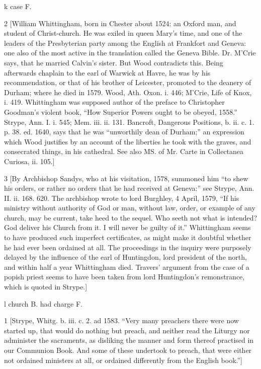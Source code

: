k
case F.

2
[William Whittingham, born in Chester about 1524: an Oxford man, and student of Christ-church. He was exiled in queen Mary’s time, and one of the leaders of the Presbyterian party among the English at Frankfort and Geneva: one also of the most active in the translation called the Geneva Bible. Dr. M’Crie says, that he married Calvin’s sister. But Wood contradicts this. Being afterwards chaplain to the earl of Warwick at Havre, he was by his recommendation, or that of his brother of Leicester, promoted to the deanery of Durham; where he died in 1579. Wood, Ath. Oxon. i. 446; M’Crie, Life of Knox, i. 419. Whittingham was supposed author of the preface to Christopher Goodman’s violent book, “How Superior Powers ought to be obeyed, 1558.” Strype, Ann. I. i. 545; Mem. iii. ii. 131. Bancroft, Dangerous Positions, b. ii. c. 1. p. 38. ed. 1640, says that he was “unworthily dean of Durham;” an expression which Wood justifies by an account of the liberties he took with the graves, and consecrated things, in his cathedral. See also MS. of Mr. Carte in Collectanea Curiosa, ii. 105.]

3
[By Archbishop Sandys, who at his visitation, 1578, summoned him “to shew his orders, or rather no orders that he had received at Geneva:” see Strype, Ann. II. ii. 168. 620. The archbishop wrote to lord Burghley, 4 April, 1579, “If his ministry without authority of God or man, without law, order, or example of any church, may be current, take heed to the sequel. Who seeth not what is intended? God deliver his Church from it. I will never be guilty of it.” Whittingham seems to have produced such imperfect certificates, as might make it doubtful whether he had ever been ordained at all. The proceedings in the inquiry were purposely delayed by the influence of the earl of Huntingdon, lord president of the north, and within half a year Whittingham died. Travers’ argument from the case of a popish priest seems to have been taken from lord Huntingdon’s remonstrance, which is quoted in Strype.]

l
church B. had charge F.

1
[Strype, Whitg. b. iii. c. 2. ad 1583. “Very many preachers there were now started up, that would do nothing but preach, and neither read the Liturgy nor administer the sacraments, as disliking the manner and form thereof practised in our Communion Book. And some of these undertook to preach, that were either not ordained ministers at all, or ordained differently from the English book.”]

